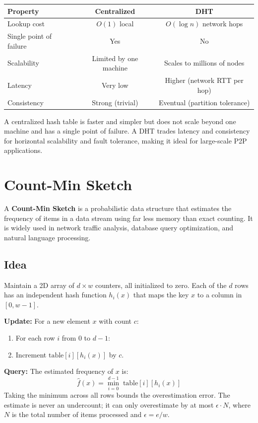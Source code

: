\begin{center}
\begin{tabular}{lcc}
\toprule
Property & Centralized & DHT \\
\midrule
Lookup cost & $O(1)$ local & $O(\log n)$ network hops \\
Single point of failure & Yes & No \\
Scalability & Limited by one machine & Scales to millions of nodes \\
Latency & Very low & Higher (network RTT per hop) \\
Consistency & Strong (trivial) & Eventual (partition tolerance) \\
\bottomrule
\end{tabular}
\end{center}

A centralized hash table is faster and simpler but does not scale beyond one machine and has a single point of failure. A DHT trades latency and consistency for horizontal scalability and fault tolerance, making it ideal for large-scale P2P applications.

\section{Count-Min Sketch}

A \textbf{Count-Min Sketch} is a probabilistic data structure that estimates the frequency of items in a data stream using far less memory than exact counting. It is widely used in network traffic analysis, database query optimization, and natural language processing.

\subsection{Idea}

Maintain a 2D array of $d \times w$ counters, all initialized to zero. Each of the $d$ rows has an independent hash function $h_{i}(x)$ that maps the key $x$ to a column in $[0, w-1]$.

\textbf{Update:} For a new element $x$ with count $c$:
\begin{enumerate}
\item For each row $i$ from 0 to $d - 1$:
\item \quad Increment $\text{table}[i][h_{i}(x)]$ by $c$.
\end{enumerate}

\textbf{Query:} The estimated frequency of $x$ is:
\[
\hat{f}(x) = \min_{i=0}^{d-1} \;\text{table}[i][h_{i}(x)]
\]
Taking the minimum across all rows bounds the overestimation error. The estimate is never an undercount; it can only overestimate by at most $\epsilon \cdot N$, where $N$ is the total number of items processed and $\epsilon = e / w$.


